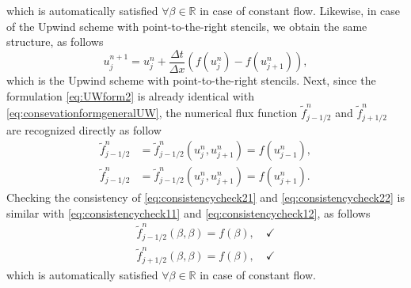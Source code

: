 \documentclass[12pt]{article}
\begin{document}
which is automatically satisfied $\forall \beta \in \mathbb{R}$ in case of constant flow. 
Likewise, in case of the Upwind scheme with point-to-the-right stencils,
we obtain the same structure, as follows
\begin{equation}\label{eq:UWform2}
	\boxed{
		u_{j}^{n+1} = 
		u_{j}^{n}
		+\frac{\Delta t}{\Delta x}
		\left(
		f(u_{j}^{n}) - f(u_{j+1}^{n})
		\right),
	}
\end{equation}
which is the Upwind scheme with point-to-the-right stencils. 
Next, since the formulation \eqref{eq:UWform2} is already identical 
with \eqref{eq:consevationformgeneralUW}, 
the numerical flux function
$\widetilde{f}_{j-1/2}^{n}$ and $\widetilde{f}_{j+1/2}^{n}$
are recognized directly as follow
\begin{align}
	\widetilde{f}_{j-1/2}^{n}
	 & = \widetilde{f}_{j-1/2}^{n} \left(u_{j}^{n}, u_{j+1}^{n}\right)
	= f(u_{j-1}^{n}),                                                 \label{eq:consistencycheck21} \\
	\widetilde{f}_{j-1/2}^{n}
	 & = \widetilde{f}_{j-1/2}^{n} \left(u_{j}^{n}, u_{j+1}^{n}\right)
	= f(u_{j+1}^{n}). \label{eq:consistencycheck22}
\end{align}
Checking the consistency of \eqref{eq:consistencycheck21} and \eqref{eq:consistencycheck22}
is similar with \eqref{eq:consistencycheck11} and \eqref{eq:consistencycheck12}, as follows
\begin{align}
	\widetilde{f}_{j-1/2}^{n} \left( \beta, \beta\right) = f(\beta), \quad \checkmark \\
	\widetilde{f}_{j+1/2}^{n} \left( \beta, \beta\right) = f(\beta), \quad \checkmark 
\end{align}
which is automatically satisfied $\forall \beta \in \mathbb{R}$ in case of constant flow. 

\clearpage
\end{document}
